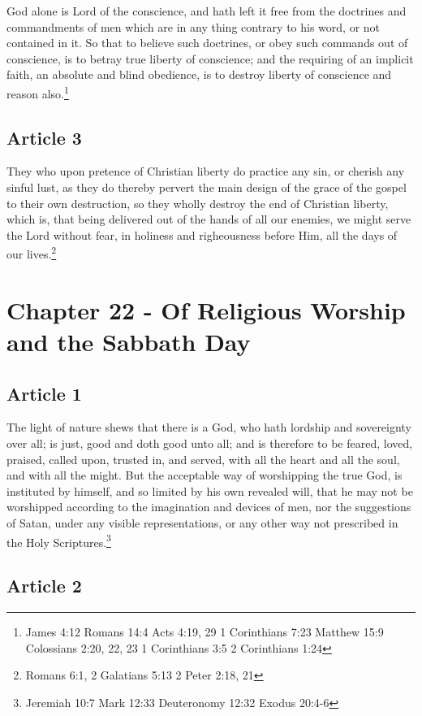 \documentclass[12pt,letterpaper]{book}
\begin{document}
God alone is Lord of the conscience, and hath left it free from the doctrines and commandments of men which are in any thing contrary to his word, or not contained in it. So that to believe such doctrines, or obey such commands out of conscience, is to betray true liberty of conscience; and the requiring of an implicit faith, an absolute and blind obedience, is to destroy liberty of conscience and reason also.\footnote{James 4:12 Romans 14:4 Acts 4:19, 29 1 Corinthians 7:23 Matthew 15:9 Colossians 2:20, 22, 23 1 Corinthians 3:5 2 Corinthians 1:24}

\section{Article 3}

They who upon pretence of Christian liberty do practice any sin, or cherish any sinful lust, as they do thereby pervert the main design of the grace of the gospel to their own destruction, so they wholly destroy the end of Christian liberty, which is, that being delivered out of the hands of all our enemies, we might serve the Lord without fear, in holiness and righeousness before Him, all the days of our lives.\footnote{Romans 6:1, 2 Galatians 5:13 2 Peter 2:18, 21}

\chapter{Chapter 22 - Of Religious Worship and the Sabbath Day}
\section{Article 1}

The light of nature shews that there is a God, who hath lordship and sovereignty over all; is just, good and doth good unto all; and is therefore to be feared, loved, praised, called upon, trusted in, and served, with all the heart and all the soul, and with all the might. But the acceptable way of worshipping the true God, is instituted by himself, and so limited by his own revealed will, that he may not be worshipped according to the imagination and devices of men, nor the suggestions of Satan, under any visible representations, or any other way not prescribed in the Holy Scriptures.\footnote{Jeremiah 10:7 Mark 12:33 Deuteronomy 12:32 Exodus 20:4-6}

\section{Article 2}
\end{document}
